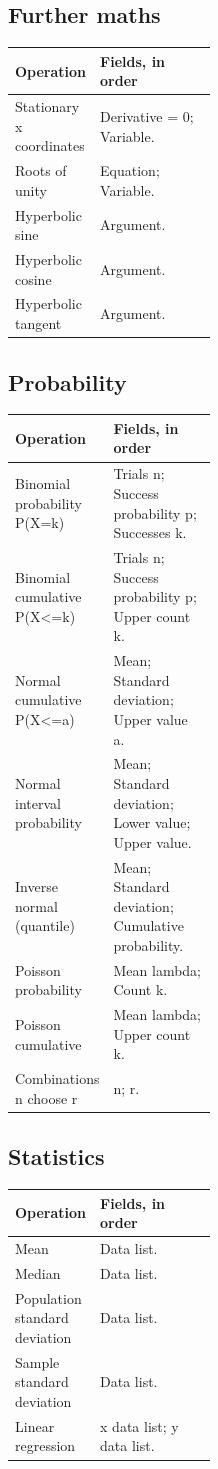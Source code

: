 \subsection{Further maths}
{\small
\begin{tabularx}{\linewidth}{@{}p{0.40\linewidth}X@{}}\toprule
Operation & Fields, in order\\\midrule
Stationary x coordinates & Derivative = 0; Variable.\\[3pt]
Roots of unity & Equation; Variable.\\[3pt]
Hyperbolic sine & Argument.\\[3pt]
Hyperbolic cosine & Argument.\\[3pt]
Hyperbolic tangent & Argument.\\[3pt]
\bottomrule\end{tabularx}}
\clearpage
\subsection{Probability}
{\small
\begin{tabularx}{\linewidth}{@{}p{0.40\linewidth}X@{}}\toprule
Operation & Fields, in order\\\midrule
Binomial probability P(X=k) & Trials n; Success probability p; Successes k.\\[3pt]
Binomial cumulative P(X<=k) & Trials n; Success probability p; Upper count k.\\[3pt]
Normal cumulative P(X<=a) & Mean; Standard deviation; Upper value a.\\[3pt]
Normal interval probability & Mean; Standard deviation; Lower value; Upper value.\\[3pt]
Inverse normal (quantile) & Mean; Standard deviation; Cumulative probability.\\[3pt]
Poisson probability & Mean lambda; Count k.\\[3pt]
Poisson cumulative & Mean lambda; Upper count k.\\[3pt]
Combinations n choose r & n; r.\\[3pt]
\bottomrule\end{tabularx}}
\subsection{Statistics}
{\small
\begin{tabularx}{\linewidth}{@{}p{0.40\linewidth}X@{}}\toprule
Operation & Fields, in order\\\midrule
Mean & Data list.\\[3pt]
Median & Data list.\\[3pt]
Population standard deviation & Data list.\\[3pt]
Sample standard deviation & Data list.\\[3pt]
Linear regression & x data list; y data list.\\[3pt]
\bottomrule\end{tabularx}}
